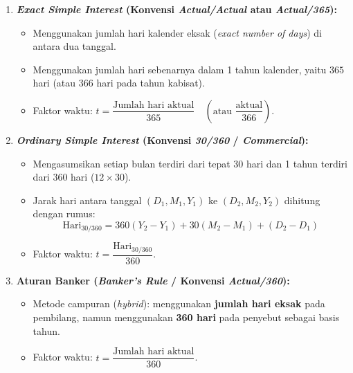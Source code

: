 \documentclass[11pt,a4paper]{article}
\begin{document}
\begin{definitionbox}
\begin{enumerate}[label=\arabic*.]
    \item \textbf{\textit{Exact Simple Interest} (Konvensi \textit{Actual/Actual} atau \textit{Actual/365}):}
    \begin{itemize}
        \item Menggunakan jumlah hari kalender eksak (\textit{exact number of days}) di antara dua tanggal.
        \item Menggunakan jumlah hari sebenarnya dalam 1 tahun kalender, yaitu $365$ hari (atau $366$ hari pada tahun kabisat).
        \item Faktor waktu: $t = \dfrac{\text{Jumlah hari aktual}}{365} \quad (\text{atau } \dfrac{\text{aktual}}{366})$.
    \end{itemize}

    \item \textbf{\textit{Ordinary Simple Interest} (Konvensi \textit{30/360} / \textit{Commercial}):}
    \begin{itemize}
        \item Mengasumsikan setiap bulan terdiri dari tepat $30$ hari dan 1 tahun terdiri dari $360$ hari ($12 \times 30$).
        \item Jarak hari antara tanggal $(D_1, M_1, Y_1)$ ke $(D_2, M_2, Y_2)$ dihitung dengan rumus:
        \begin{equation}
            \text{Hari}_{30/360} = 360(Y_2 - Y_1) + 30(M_2 - M_1) + (D_2 - D_1)
        \end{equation}
        \item Faktor waktu: $t = \dfrac{\text{Hari}_{30/360}}{360}$.
    \end{itemize}

    \item \textbf{Aturan Banker (\textit{Banker's Rule} / Konvensi \textit{Actual/360}):}
    \begin{itemize}
        \item Metode campuran (\textit{hybrid}): menggunakan \textbf{jumlah hari eksak} pada pembilang, namun menggunakan \textbf{360 hari} pada penyebut sebagai basis tahun.
        \item Faktor waktu: $t = \dfrac{\text{Jumlah hari aktual}}{360}$.
    \end{itemize}
\end{enumerate}
\end{definitionbox}
\end{document}
